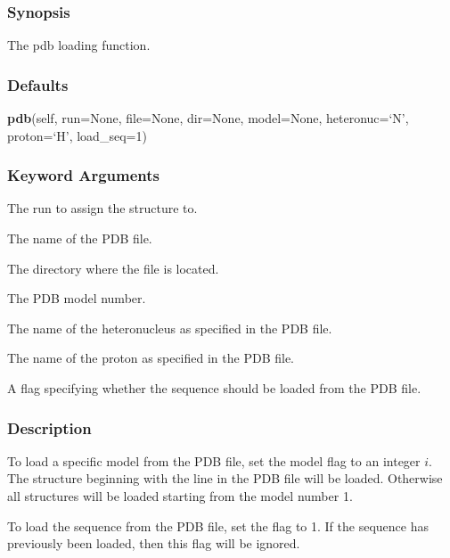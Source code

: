   
 \subsubsection{Synopsis} 

 The pdb loading function. 
  

  
 \subsubsection{Defaults} 

 \textsf{\textbf{pdb}(self, run=None, file=None, dir=None, model=None, heteronuc=`N', proton=`H', load\_seq=1)} 

  
 \subsubsection{Keyword Arguments} 

   The run to assign the structure to.   

   The name of the PDB file.   

   The directory where the file is located.   

   The PDB model number.   

   The name of the heteronucleus as specified in the PDB file.   

   The name of the proton as specified in the PDB file.   

   A flag specifying whether the sequence should be loaded from the PDB file.  

  

  
 \subsubsection{Description} 

 To load a specific model from the PDB file, set the model flag to an integer $i$.  The structure beginning with the line  in the PDB file will be loaded.  Otherwise all structures will be loaded starting from the model number 1. 
  

 To load the sequence from the PDB file, set the  flag to 1.  If the sequence has previously been loaded, then this flag will be ignored. 
  

